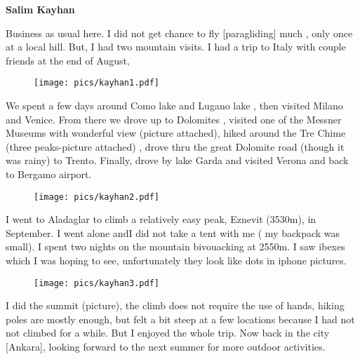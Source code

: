 \documentclass[10pt,a4paper]{article}
\begin{document}
\begin{multicols}{2}
\textbf{Salim Kayhan}




Business as usual here. I did not get chance to fly [paragliding] much , only once at a local hill.
But, I had two mountain visits. I had a trip to Italy with couple friends at the end of August,\begin{wrapfigure}{r}{0.7\linewidth}
	\vspace{-20pt}
	\begin{center}
		\texttt{[image: pics/kayhan1.pdf]}
	\end{center}
	\vspace{-20pt}
\end{wrapfigure}
We spent a few days around Como lake and Lugano lake ,  then visited Milano and Venice.
From there we drove up to Dolomites , visited one of the Messner Museums with wonderful view (picture attached), hiked around the Tre Chime (three peaks-picture attached) , drove thru the great Dolomite road (though it was rainy) to Trento. Finally, drove by lake Garda and visited Verona and back to Bergamo airport. 
\begin{wrapfigure}{l}{1.5\linewidth}
	\vspace{-20pt}
	\begin{center}
		\texttt{[image: pics/kayhan2.pdf]}
	\end{center}
	\vspace{-20pt}
\end{wrapfigure}


    I went to Aladaglar to climb a relatively easy peak, Eznevit (3530m), in September. I went alone andI did not take a tent with me ( my backpack was small). I spent two nights on the mountain bivouacking at 2550m.    I saw ibexes which I was hoping to see, unfortunately they look like dots in iphone pictures.
\begin{wrapfigure}{r}{0.9\linewidth}
	\vspace{-20pt}
	\begin{center}
		\texttt{[image: pics/kayhan3.pdf]}
	\end{center}
	\vspace{-20pt}
\end{wrapfigure}
    
     I did the summit (picture), the climb does not require the use of hands, hiking poles are mostly enough, but felt a bit steep at a few locations because I had not not climbed for a while. But I enjoyed the whole trip.
Now back in the city [Ankara], looking forward to the next summer for more outdoor activities.


\end{multicols}
\end{document}
